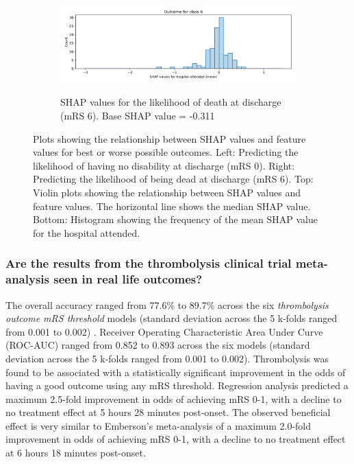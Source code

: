 \begin{figure}[ht]
\begin{subfigure}{.5\textwidth}
      \label{fig:mrs0_violin}
    \end{subfigure}%
    \begin{subfigure}{.5\textwidth}
      \centering
      \captionsetup{width=.9\linewidth}
      \includegraphics[trim={0 0 0 1cm}, clip, width=1\linewidth]
        {./images/053_xgb_7_features_1fold_hosp_shap_hist_mrs6}\\
      \caption{\footnotesize{SHAP values for the likelihood of death at discharge (mRS 6). Base SHAP value = -0.311}}
      \label{fig:mrs6_violin}
    \end{subfigure}
  \caption{Plots showing the relationship between SHAP values and feature values for best or worse possible outcomes. Left: Predicting the likelihood of having no disability at discharge (mRS 0). Right: Predicting the likelihood of being dead at discharge (mRS 6). Top: Violin plots showing the relationship between SHAP values and feature values. The horizontal line shows the median SHAP value. Bottom: Histogram showing the frequency of the mean SHAP value for the hospital attended.}
    \label{fig:shap_outcome_model}
\end{figure}

\subsubsection{Are the results from the thrombolysis clinical trial meta-analysis seen in real life outcomes?} 

The overall accuracy ranged from 77.6\% to 89.7\% across the six \textit{thrombolysis outcome mRS threshold} models (standard deviation across the 5 k-folds ranged from 0.001 to 0.002) \cite{pearn_thrombolysis_2024}. Receiver Operating Characteristic Area Under Curve (ROC-AUC) ranged from 0.852 to 0.893 across the six models (standard deviation across the 5 k-folds ranged from 0.001 to 0.002). Thrombolysis was found to be associated with a statistically significant improvement in the odds of having a good outcome using any mRS threshold. Regression analysis predicted a maximum 2.5-fold improvement in odds of achieving mRS 0-1, with a decline to no treatment effect at 5 hours 28 minutes post-onset. The observed beneficial effect is very similar to Emberson’s meta-analysis \cite{emberson_effect_2014} of a maximum 2.0-fold improvement in odds of achieving mRS 0-1, with a decline to no treatment effect at 6 hours 18 minutes post-onset.

